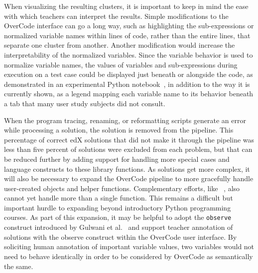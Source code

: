 When visualizing the resulting clusters, it is important to keep in mind the ease with which teachers can interpret the results. Simple modifications to the OverCode interface can go a long way, such as highlighting the sub-expressions or normalized variable names within lines of code, rather than the entire lines, that separate one cluster from another. Another modification would increase the interpretability of the normalized variables. Since the variable behavior is used to normalize variable names, the values of variables and sub-expressions during execution on a test case could be displayed just beneath or alongside the code, as demonstrated in an experimental Python notebook~\cite{kevinkwokdemo}, in addition to the way it is currently shown, as a legend mapping each variable name to its behavior beneath a tab that many user study subjects did not consult. 



When the program tracing, renaming, or reformatting scripts generate an error while processing a solution, the solution is removed from the pipeline. This percentage of correct edX solutions that did not make it through the pipeline was less than five percent of solutions were excluded from each problem, but that can be reduced further by adding support for handling more special cases and language constructs to these library functions. As solutions get more complex, it will also be necessary to expand the OverCode pipeline to more gracefully handle user-created objects and helper functions. Complementary efforts, like ~\cite{choudhury2016autostyle}, also cannot yet handle more than a single function. This remains a difficult but important hurdle to expanding beyond introductory Python programming courses. As part of this expansion, it may be helpful to adopt the \texttt{observe} construct introduced by Gulwani et al.~\cite{gulwani_fse14} and support teacher annotation of solutions with the observe construct within the OverCode user interface. By soliciting human annotation of important variable values, two variables would not need to behave identically in order to be considered by OverCode as semantically the same.%

